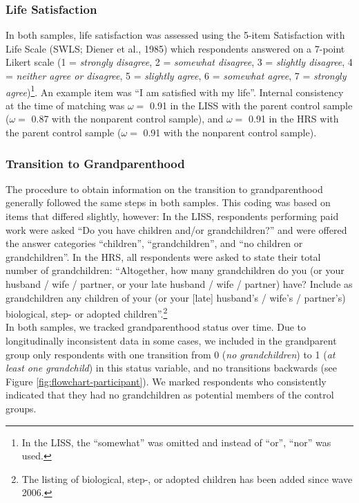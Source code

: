 \documentclass[
  english,
  man, noextraspace,floatsintext]{apa7}
\begin{document}
\hypertarget{life-satisfaction}{%
\subsubsection{Life Satisfaction}\label{life-satisfaction}}

In both samples, life satisfaction was assessed using the 5-item Satisfaction with Life Scale (SWLS; Diener et al., 1985) which respondents answered on a 7-point Likert scale (1 = \emph{strongly disagree}, 2 = \emph{somewhat disagree}, 3 = \emph{slightly disagree}, 4 = \emph{neither agree or disagree}, 5 = \emph{slightly agree}, 6 = \emph{somewhat agree}, 7 = \emph{strongly agree})\footnote{In the LISS, the \enquote{somewhat} was omitted and instead of \enquote{or}, \enquote{nor} was used.}. An example item was \enquote{I am satisfied with my life}. Internal consistency at the time of matching was \(\omega =\) 0.91 in the LISS with the parent control sample (\(\omega =\) 0.87 with the nonparent control sample), and \(\omega =\) 0.91 in the HRS with the parent control sample (\(\omega =\) 0.91 with the nonparent control sample).

\hypertarget{transition-to-grandparenthood}{%
\subsubsection{Transition to Grandparenthood}\label{transition-to-grandparenthood}}

The procedure to obtain information on the transition to grandparenthood generally followed the same steps in both samples. This coding was based on items that differed slightly, however: In the LISS, respondents performing paid work were asked \enquote{Do you have children and/or grandchildren?} and were offered the answer categories \enquote{children}, \enquote{grandchildren}, and \enquote{no children or grandchildren}. In the HRS, all respondents were asked to state their total number of grandchildren: \enquote{Altogether, how many grandchildren do you (or your husband / wife / partner, or your late husband / wife / partner) have? Include as grandchildren any children of your (or your {[}late{]} husband's / wife's / partner's) biological, step- or adopted children}.\footnote{The listing of biological, step-, or adopted children has been added since wave 2006.}\\
In both samples, we tracked grandparenthood status over time. Due to longitudinally inconsistent data in some cases, we included in the grandparent group only respondents with one transition from 0 (\emph{no grandchildren}) to 1 (\emph{at least one grandchild}) in this status variable, and no transitions backwards (see Figure \ref{fig:flowchart-participant}). We marked respondents who consistently indicated that they had no grandchildren as potential members of the control groups.
\end{document}
